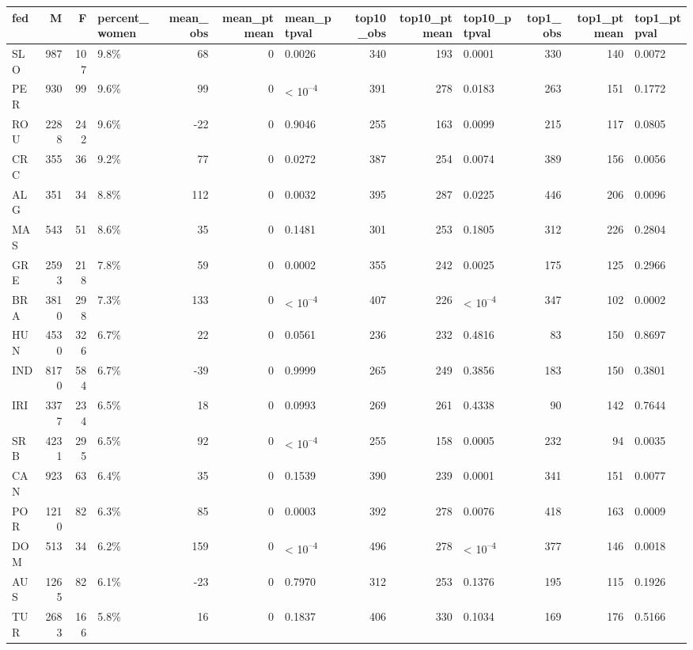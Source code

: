 
\begin{tabular}{l|r|r|l|r|r|l|r|r|l|r|r|l}
\hline
fed & M & F & percent_women & mean_obs & mean_ptmean & mean_ptpval & top10_obs & top10_ptmean & top10_ptpval & top1_obs & top1_ptmean & top1_ptpval\\
\hline
SLO & 987 & 107 & 9.8\% & 68 & 0 & 0.0026 & 340 & 193 & 0.0001 & 330 & 140 & 0.0072\\
\hline
PER & 930 & 99 & 9.6\% & 99 & 0 & < 10\textsuperscript{--4} & 391 & 278 & 0.0183 & 263 & 151 & 0.1772\\
\hline
ROU & 2288 & 242 & 9.6\% & -22 & 0 & 0.9046 & 255 & 163 & 0.0099 & 215 & 117 & 0.0805\\
\hline
CRC & 355 & 36 & 9.2\% & 77 & 0 & 0.0272 & 387 & 254 & 0.0074 & 389 & 156 & 0.0056\\
\hline
ALG & 351 & 34 & 8.8\% & 112 & 0 & 0.0032 & 395 & 287 & 0.0225 & 446 & 206 & 0.0096\\
\hline
MAS & 543 & 51 & 8.6\% & 35 & 0 & 0.1481 & 301 & 253 & 0.1805 & 312 & 226 & 0.2804\\
\hline
GRE & 2593 & 218 & 7.8\% & 59 & 0 & 0.0002 & 355 & 242 & 0.0025 & 175 & 125 & 0.2966\\
\hline
BRA & 3810 & 298 & 7.3\% & 133 & 0 & < 10\textsuperscript{--4} & 407 & 226 & < 10\textsuperscript{--4} & 347 & 102 & 0.0002\\
\hline
HUN & 4530 & 326 & 6.7\% & 22 & 0 & 0.0561 & 236 & 232 & 0.4816 & 83 & 150 & 0.8697\\
\hline
IND & 8170 & 584 & 6.7\% & -39 & 0 & 0.9999 & 265 & 249 & 0.3856 & 183 & 150 & 0.3801\\
\hline
IRI & 3377 & 234 & 6.5\% & 18 & 0 & 0.0993 & 269 & 261 & 0.4338 & 90 & 142 & 0.7644\\
\hline
SRB & 4231 & 295 & 6.5\% & 92 & 0 & < 10\textsuperscript{--4} & 255 & 158 & 0.0005 & 232 & 94 & 0.0035\\
\hline
CAN & 923 & 63 & 6.4\% & 35 & 0 & 0.1539 & 390 & 239 & 0.0001 & 341 & 151 & 0.0077\\
\hline
POR & 1210 & 82 & 6.3\% & 85 & 0 & 0.0003 & 392 & 278 & 0.0076 & 418 & 163 & 0.0009\\
\hline
DOM & 513 & 34 & 6.2\% & 159 & 0 & < 10\textsuperscript{--4} & 496 & 278 & < 10\textsuperscript{--4} & 377 & 146 & 0.0018\\
\hline
AUS & 1265 & 82 & 6.1\% & -23 & 0 & 0.7970 & 312 & 253 & 0.1376 & 195 & 115 & 0.1926\\
\hline
TUR & 2683 & 166 & 5.8\% & 16 & 0 & 0.1837 & 406 & 330 & 0.1034 & 169 & 176 & 0.5166\\

\end{tabular}

